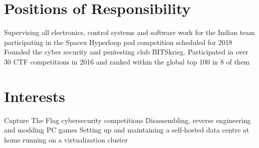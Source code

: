 \documentclass[]{illustris-resume-openfont}
\begin{document}
\begin{minipage}[t]{0.66\textwidth}



\section{Positions of Responsibility}
Supervising all electronics, control systems and software work for the Indian team participating in the Spacex Hyperloop pod competition scheduled for 2018\\
\sectionsep
{}
Founded the cyber security and pentesting club BITSkrieg. Participated in over 30 CTF competitions in 2016 and ranked within the global top 100 in 8 of them

\section{Interests}
Capture The Flag cybersecurity competitions \textbullet{} Disassembling, reverse engineering and modding PC games \textbullet{} Setting up and maintaining a self-hosted data centre at home running on a virtualization cluster
\sectionsep

\end{minipage} 
\end{document}
